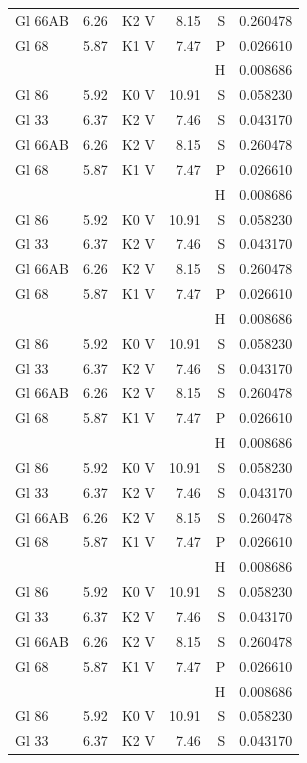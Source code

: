 \documentclass{aa}
\begin{document}
\begin{appendix}
\begin{landscape}
\begin{longtable}{lllrrr}
Gl 66AB  & 6.26 & K2 V & 8.15 & S & 0.260478\\
Gl 68    & 5.87 & K1 V & 7.47 & P & 0.026610\\
         &      &      &      & H & 0.008686\\
Gl 86    & 5.92 & K0 V & 10.91& S & 0.058230\\   Gl 33    & 6.37 & K2 V & 7.46 & S & 0.043170\\
Gl 66AB  & 6.26 & K2 V & 8.15 & S & 0.260478\\
Gl 68    & 5.87 & K1 V & 7.47 & P & 0.026610\\
         &      &      &      & H & 0.008686\\
Gl 86    & 5.92 & K0 V & 10.91& S & 0.058230\\   Gl 33    & 6.37 & K2 V & 7.46 & S & 0.043170\\
Gl 66AB  & 6.26 & K2 V & 8.15 & S & 0.260478\\
Gl 68    & 5.87 & K1 V & 7.47 & P & 0.026610\\
         &      &      &      & H & 0.008686\\
Gl 86    & 5.92 & K0 V & 10.91& S & 0.058230\\   Gl 33    & 6.37 & K2 V & 7.46 & S & 0.043170\\
Gl 66AB  & 6.26 & K2 V & 8.15 & S & 0.260478\\
Gl 68    & 5.87 & K1 V & 7.47 & P & 0.026610\\
         &      &      &      & H & 0.008686\\
Gl 86    & 5.92 & K0 V & 10.91& S & 0.058230\\   Gl 33    & 6.37 & K2 V & 7.46 & S & 0.043170\\
Gl 66AB  & 6.26 & K2 V & 8.15 & S & 0.260478\\
Gl 68    & 5.87 & K1 V & 7.47 & P & 0.026610\\
         &      &      &      & H & 0.008686\\
Gl 86    & 5.92 & K0 V & 10.91& S & 0.058230\\   Gl 33    & 6.37 & K2 V & 7.46 & S & 0.043170\\
Gl 66AB  & 6.26 & K2 V & 8.15 & S & 0.260478\\
Gl 68    & 5.87 & K1 V & 7.47 & P & 0.026610\\
         &      &      &      & H & 0.008686\\
Gl 86    & 5.92 & K0 V & 10.91& S & 0.058230\\   Gl 33    & 6.37 & K2 V & 7.46 & S & 0.043170\\

\end{longtable}
\end{landscape}
\end{appendix}
\end{document}
